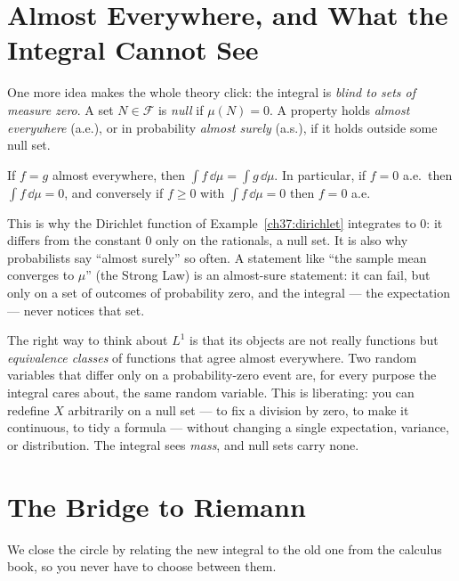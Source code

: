 \section{Almost Everywhere, and What the Integral Cannot See}
\label{ch37:ae}

One more idea makes the whole theory click: the integral is \emph{blind to sets
of measure zero}. A set $N\in\mathcal F$ is \emph{null} if $\mu(N)=0$. A
property holds \emph{almost everywhere} (a.e.), or in probability \emph{almost
surely} (a.s.), if it holds outside some null set.

\begin{proposition}
\label{ch37:prop-ae}
If $f=g$ almost everywhere, then $\int f\,\dd\mu = \int g\,\dd\mu$. In
particular, if $f=0$ a.e.\ then $\int f\,\dd\mu = 0$, and conversely if $f\ge 0$
with $\int f\,\dd\mu = 0$ then $f=0$ a.e.
\end{proposition}

This is why the Dirichlet function of Example~\ref{ch37:dirichlet} integrates to
$0$: it differs from the constant $0$ only on the rationals, a null set. It is
also why probabilists say ``almost surely'' so often. A statement like ``the
sample mean converges to $\mu$'' (the Strong Law) is an almost-sure statement:
it can fail, but only on a set of outcomes of probability zero, and the integral
--- the expectation --- never notices that set.

\begin{happeningbox}
The right way to think about $L^1$ is that its objects are not really functions
but \emph{equivalence classes} of functions that agree almost everywhere. Two
random variables that differ only on a probability-zero event are, for every
purpose the integral cares about, the same random variable. This is liberating:
you can redefine $X$ arbitrarily on a null set --- to fix a division by zero, to
make it continuous, to tidy a formula --- without changing a single expectation,
variance, or distribution. The integral sees \emph{mass}, and null sets carry
none.
\end{happeningbox}

\section{The Bridge to Riemann}
\label{ch37:riemann-bridge}

We close the circle by relating the new integral to the old one from the
calculus book, so you never have to choose between them.

